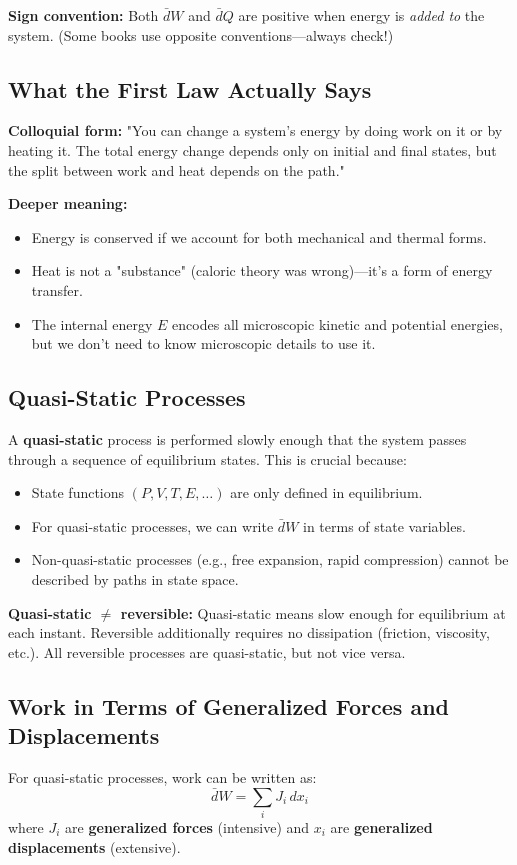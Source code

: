 \documentclass[9pt,twocoloumn]{article}
\begin{document}
\textbf{Sign convention:} Both $\bar{d}W$ and $\bar{d}Q$ are positive when energy is \emph{added to} the system. (Some books use opposite conventions—always check!)

\subsection{What the First Law Actually Says}
\textbf{Colloquial form:} "You can change a system's energy by doing work on it or by heating it. The total energy change depends only on initial and final states, but the split between work and heat depends on the path."

\textbf{Deeper meaning:}
\begin{itemize}
    \item Energy is conserved if we account for both mechanical and thermal forms.
    \item Heat is not a "substance" (caloric theory was wrong)—it's a form of energy transfer.
    \item The internal energy $E$ encodes all microscopic kinetic and potential energies, but we don't need to know microscopic details to use it.
\end{itemize}

\subsection{Quasi-Static Processes}
A \textbf{quasi-static} process is performed slowly enough that the system passes through a sequence of equilibrium states. This is crucial because:
\begin{itemize}
    \item State functions $(P, V, T, E, \ldots)$ are only defined in equilibrium.
    \item For quasi-static processes, we can write $\bar{d}W$ in terms of state variables.
    \item Non-quasi-static processes (e.g., free expansion, rapid compression) cannot be described by paths in state space.
\end{itemize}

\textbf{Quasi-static $\neq$ reversible:} Quasi-static means slow enough for equilibrium at each instant. Reversible additionally requires no dissipation (friction, viscosity, etc.). All reversible processes are quasi-static, but not vice versa.

\subsection{Work in Terms of Generalized Forces and Displacements}
For quasi-static processes, work can be written as:
\begin{equation}
\bar{d}W = \sum_i J_i \, dx_i
\end{equation}
where $J_i$ are \textbf{generalized forces} (intensive) and $x_i$ are \textbf{generalized displacements} (extensive).
\end{document}
